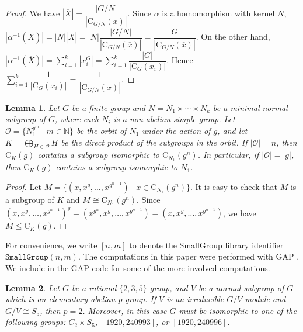 \documentclass[11pt]{article}
\providecommand{\bbN}{{\mathbb N}} %
\providecommand{\C}{{\mathrm{C}}}
\providecommand{\olx}{{\overline{x}}}
\providecommand{\olX}{{\overline{X}}}
\providecommand{\calO}{\mathcal{O}}
\providecommand{\bbN}{\mathbb{N}}
\newtheorem{lem}{Lemma}
\begin{document}
\begin{proof}
    We have $|\olX|=\dfrac{|G/N|}{|\C_{G/N}(\olx)|}$.
    Since $\alpha$ is a homomorphism with kernel $N$,
    $|\alpha^{-1}(\olX)|=|N||\olX|=|N|\dfrac{|G/N|}{|\C_{G/N}(\olx)|}=\dfrac{|G|}{|\C_{G/N}(\olx)|}$.
    On the other hand, $|\alpha^{-1}(\olX)|=\sum_{i=1}^{k}|x_i^G|=\sum_{i=1}^{k}\dfrac{|G|}{|\C_{G}(x_i)|}$.
    Hence $\sum_{i=1}^{k} \dfrac{1}{|\C_G(x_i)|} = \dfrac{1}{|\C_{G/N}(\overline{x})|}$.
\end{proof}

\begin{lem}
\label{Centre2}
    Let $G$ be a finite group and $N=N_1\times \cdots \times N_k$ be a minimal normal subgroup of $G$, 
    where each $N_i$ is a non-abelian simple group.
    Let $\calO=\{N_1^{g^m}\mid m\in \bbN\}$ be the orbit of $N_1$ under the action of $g$,
    and let $K=\bigoplus_{H\in\calO}H$ be the direct product of the subgroups in the orbit.
    If $|\calO|=n$, then $\C_K(g)$ contains a subgroup isomorphic to $\C_{N_1}(g^n)$.
    In particular, if $|\calO|=|g|$, then $\C_K(g)$ contains a subgroup isomorphic to $N_1$.
\end{lem}

\begin{proof}
    Let $M = \{(x, x^g,\ldots, x^{g^{n-1}}) \mid x\in \C_{N_1}(g^n) \}$.
    It is easy to check that $M$ is a subgroup of $K$ and $M\cong \C_{N_1}(g^n)$.
    Since $(x, x^g,\ldots, x^{g^{n-1}})^g=(x^{g^n},x^g,\ldots, x^{g^{n-1}})
    =(x, x^g,\ldots, x^{g^{n-1}})$,
    we have $M\leq \C_K(g)$.
\end{proof}



    For convenience, we write $[n,m]$ to denote the SmallGroup library identifier $\texttt{SmallGroup}(n,m)$.
    The computations in this paper were performed with GAP \cite{GAP}.
    We include in \cite{Git} the GAP code for some of the more involved computations.


\begin{lem}
\label{KS5}
    Let $G$ be a rational $\{2,3,5\}$-group, and $V$ be a normal subgroup of $G$
    which is an elementary abelian $p$-group.
    If $V$ is an irreducible $G/V$-module and $G/V\cong S_5$, then $p=2$.
    Moreover, in this case $G$ must be isomorphic to one of the following groups:
    $C_2\times S_5$, $[1920,240993]$, or $[1920,240996]$.
\end{lem}
\end{document}
